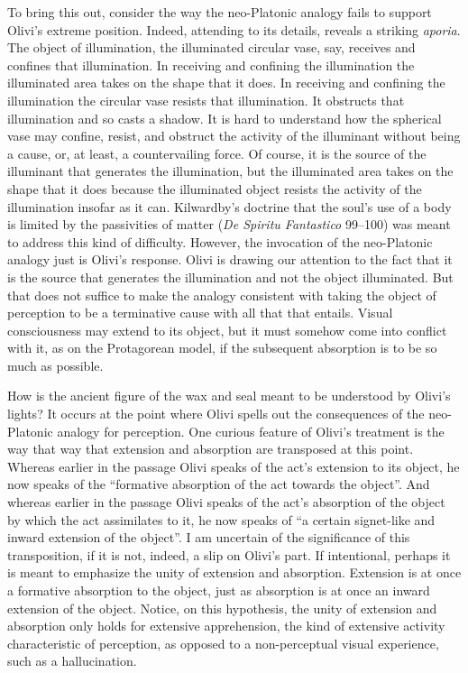 To bring this out, consider the way the neo-Platonic analogy fails to support Olivi's extreme position. Indeed, attending to its details, reveals a striking \emph{aporia}. The object of illumination, the illuminated circular vase, say, receives and confines that illumination. In receiving and confining the illumination the illuminated area takes on the shape that it does. In receiving and confining the illumination the circular vase resists that illumination. It obstructs that illumination and so casts a shadow. It is hard to understand how the spherical vase may confine, resist, and obstruct the activity of the illuminant without being a cause, or, at least, a countervailing force. Of course, it is the source of the illuminant that generates the illumination, but the illuminated area takes on the shape that it does because the illuminated object resists the activity of the illumination insofar as it can. Kilwardby's doctrine that the soul's use of a body is limited by the passivities of matter (\emph{De Spiritu Fantastico} 99–100) was meant to address this kind of difficulty. However, the invocation of the neo-Platonic analogy just is Olivi's response. Olivi is drawing our attention to the fact that it is the source that generates the illumination and not the object illuminated. But that does not suffice to make the analogy consistent with taking the object of perception to be a terminative cause with all that that entails. Visual consciousness may extend to its object, but it must somehow come into conflict with it, as on the Protagorean model, if the subsequent absorption is to be so much as possible. 

How is the ancient figure of the wax and seal meant to be understood by Olivi's lights? It occurs at the point where Olivi spells out the consequences of the neo-Platonic analogy for perception. One curious feature of Olivi's treatment is the way that way that extension and absorption are transposed at this point. Whereas earlier in the passage Olivi speaks of the act's extension to its object, he now speaks of the ``formative absorption of the act towards the object''. And whereas earlier in the passage Olivi speaks of the act's absorption of the object by which the act assimilates to it, he now speaks of ``a certain signet-like and inward extension of the object''. I am uncertain of the significance of this transposition, if it is not, indeed, a slip on Olivi's part. If intentional, perhaps it is meant to emphasize the unity of extension and absorption. Extension is at once a formative absorption to the object, just as absorption is at once an inward extension of the object. Notice, on this hypothesis, the unity of extension and absorption only holds for extensive apprehension, the kind of extensive activity characteristic of perception, as opposed to a non-perceptual visual experience, such as a hallucination.

